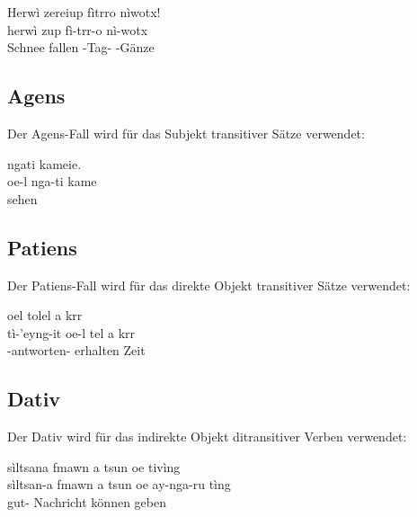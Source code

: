 \begin{interlin}
	\glll \Npawl{}Herwì zereiup fìtrro nìwotx! \\
	herwì zup fì-trr-o nì-wotx \\
	Schnee fallen -Tag- -Gänze \\
\end{interlin}

\subsection{Agens} Der Agens-Fall wird für das Subjekt transitiver Sätze verwendet:

\begin{interlin}
	\glll {} ngati kameie. \\
	oe-l nga-ti kame \\
	  sehen \\
\end{interlin}

\subsection{Patiens} Der Patiens-Fall wird für das direkte Objekt transitiver Sätze verwendet:

\begin{interlin}
	\glll \Npawl{} oel tolel a krr \\
	tì-'eyng-it oe-l tel a krr \\
	-antworten-  erhalten  Zeit \\
\end{interlin}

\subsection{Dativ} Der Dativ wird für das indirekte Objekt ditransitiver Verben verwendet:

\begin{interlin}
	\glll \Npawl{}sìltsana fmawn a tsun oe  tivìng \\
	sìltsan-a fmawn a tsun oe ay-nga-ru tìng \\
	gut- Nachricht  können   geben \\
\end{interlin}

